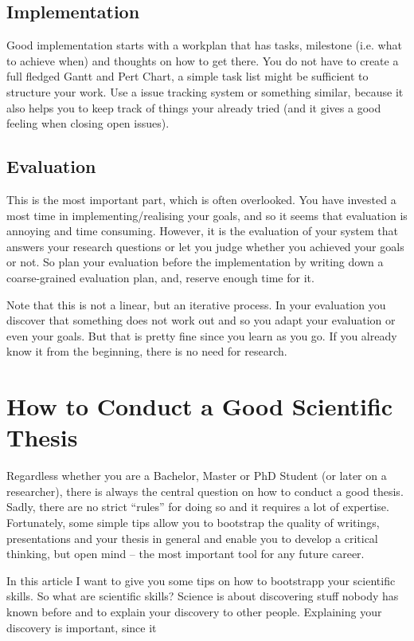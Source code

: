 \subsection{Implementation}
Good implementation starts with a workplan that has tasks, milestone (i.e. what to achieve when) and thoughts on how to get there. You do not have to create a full fledged Gantt and Pert Chart, a simple task list might be sufficient to structure your work. Use a issue tracking system or something similar, because it also helps you to keep track of things your already tried (and it gives a good feeling when closing open issues).

\subsection{Evaluation}
This is the most important part, which is often overlooked. You have invested a most time in implementing/realising your goals, and so it seems that evaluation is annoying and time consuming. However, it is the evaluation of your system that answers your research questions or let you judge whether you achieved your goals or not. So plan your evaluation before the implementation by writing down a coarse-grained evaluation plan, and, reserve enough time for it.

Note that this is not a linear, but an iterative process. In your evaluation you discover that something does not work out and so you adapt your evaluation or even your goals. But that is pretty fine since you learn as you go. If you already know it from the beginning, there is no need for research.


\section{How to Conduct a Good Scientific Thesis}

Regardless whether you are a Bachelor, Master or PhD Student (or later on a researcher), there is always the central question on how to conduct a good thesis. Sadly, there are no strict “rules” for doing so and it requires a lot of expertise. Fortunately, some simple tips allow you to bootstrap the quality of writings, presentations and your thesis in general and enable you to develop a critical thinking, but open mind – the most important tool for any future career.

In this article I want to give you some tips on how to bootstrapp your scientific skills. So what are scientific skills? Science is about discovering stuff nobody has known before and to explain your discovery to other people. Explaining your discovery is important, since it

